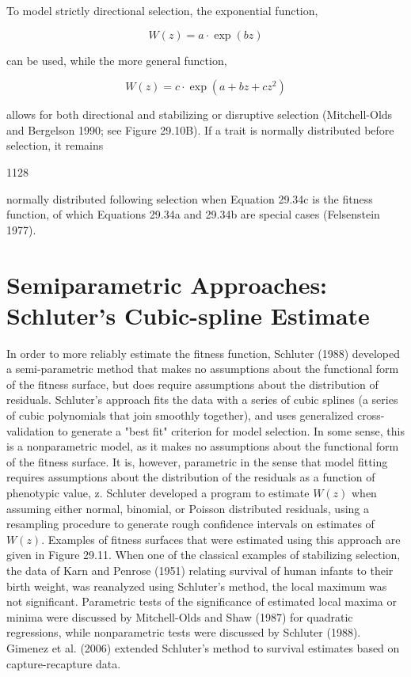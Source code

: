 \documentclass{article}
\begin{document}
To model strictly directional selection, the exponential function,

\begin{equation}
W(z)=a\cdot\exp(bz)
\tag{29.34b}
\label{eq:29_34b}
\end{equation}

can be used, while the more general function,

\begin{equation}
W(z)=c\cdot\exp(a+bz+cz^{2})
\tag{29.34c}
\label{eq:29_34c}
\end{equation}

allows for both directional and stabilizing or disruptive selection (Mitchell-Olds and Bergelson 1990; see Figure 29.10B). If a trait is normally distributed before selection, it remains

1128

normally distributed following selection when Equation 29.34c is the fitness function, of which Equations 29.34a and 29.34b are special cases (Felsenstein 1977).

\section{Semiparametric Approaches: Schluter's Cubic-spline Estimate}
In order to more reliably estimate the fitness function, Schluter (1988) developed a semi-parametric method that makes no assumptions about the functional form of the fitness surface, but does require assumptions about the distribution of residuals. Schluter's approach fits the data with a series of cubic splines (a series of cubic polynomials that join smoothly together), and uses generalized cross-validation to generate a "best fit" criterion for model selection. In some sense, this is a nonparametric model, as it makes no assumptions about the functional form of the fitness surface. It is, however, parametric in the sense that model fitting requires assumptions about the distribution of the residuals as a function of phenotypic value, z. Schluter developed a program to estimate  $ W(z) $ when assuming either normal, binomial, or Poisson distributed residuals, using a resampling procedure to generate rough confidence intervals on estimates of  $ W(z) $. Examples of fitness surfaces that were estimated using this approach are given in Figure 29.11. When one of the classical examples of stabilizing selection, the data of Karn and Penrose (1951) relating survival of human infants to their birth weight, was reanalyzed using Schluter's method, the local maximum was not significant. Parametric tests of the significance of estimated local maxima or minima were discussed by Mitchell-Olds and Shaw (1987) for quadratic regressions, while nonparametric tests were discussed by Schluter (1988). Gimenez et al. (2006) extended Schluter's method to survival estimates based on capture-recapture data.
\end{document}
